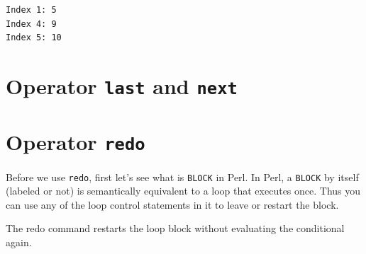 \documentclass[]{book}
\makeatletter
\newenvironment{Shaded}{\begin{snugshade}}{\end{snugshade}}
\newcommand{\CharTok}[1]{\textcolor[rgb]{0.31,0.60,0.02}{#1}}
\newcommand{\CommentTok}[1]{\textcolor[rgb]{0.56,0.35,0.01}{\textit{#1}}}
\newcommand{\DataTypeTok}[1]{\textcolor[rgb]{0.13,0.29,0.53}{#1}}
\newcommand{\DecValTok}[1]{\textcolor[rgb]{0.00,0.00,0.81}{#1}}
\newcommand{\FunctionTok}[1]{\textcolor[rgb]{0.00,0.00,0.00}{#1}}
\newcommand{\KeywordTok}[1]{\textcolor[rgb]{0.13,0.29,0.53}{\textbf{#1}}}
\newcommand{\NormalTok}[1]{#1}
\newcommand{\StringTok}[1]{\textcolor[rgb]{0.31,0.60,0.02}{#1}}
\newenvironment{kframe}{%
\medskip{}
\setlength{\fboxsep}{.8em}
 \def\at@end@of@kframe{}%
 \ifinner\ifhmode%
  \def\at@end@of@kframe{\end{minipage}}%
  \begin{minipage}{\columnwidth}%
 \fi\fi%
 \def\FrameCommand##1{\hskip\@totalleftmargin \hskip-\fboxsep
 \colorbox{shadecolor}{##1}\hskip-\fboxsep
     \hskip-\linewidth \hskip-\@totalleftmargin \hskip\columnwidth}%
 \MakeFramed {\advance\hsize-\width
   \@totalleftmargin\z@ \linewidth\hsize
   \@setminipage}}%
 {\par\unskip\endMakeFramed%
 \at@end@of@kframe}
\renewenvironment{Shaded}{\begin{kframe}}{\end{kframe}}
\makeatother
\begin{document}
\begin{Shaded}
\end{Shaded}

\begin{verbatim}
Index 1: 5
Index 4: 9
Index 5: 10
\end{verbatim}

\hypertarget{operator-last-and-next}{%
\section{\texorpdfstring{Operator \texttt{last} and \texttt{next}}{Operator last and next}}\label{operator-last-and-next}}

\hypertarget{operator-redo}{%
\section{\texorpdfstring{Operator \texttt{redo}}{Operator redo}}\label{operator-redo}}

Before we use \texttt{redo}, first let's see what is \texttt{BLOCK} in Perl. In Perl, a \texttt{BLOCK} by itself (labeled or not) is semantically equivalent to a loop that executes once. Thus you can use any of the loop control statements in it to leave or restart the block.

The redo command restarts the loop block without evaluating the conditional again.
\end{document}
